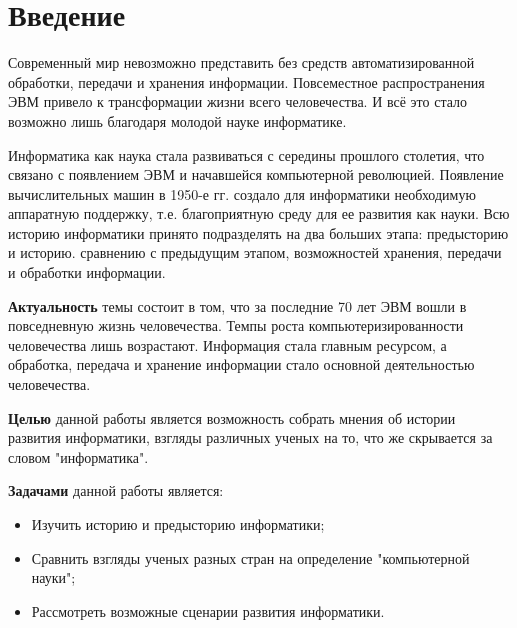 \chapter*{Введение}							%


Современный мир невозможно представить без средств автоматизированной обработки, передачи и хранения информации. Повсеместное распространения ЭВМ привело к трансформации жизни всего человечества. И всё это стало возможно лишь благодаря молодой науке информатике.

Информатика как наука стала развиваться с середины прошлого столетия, что связано с появлением ЭВМ и начавшейся компьютерной революцией. Появление вычислительных машин в 1950-е гг. создало для информатики необходимую аппаратную поддержку, т.е. благоприятную среду для ее развития как науки. Всю историю информатики принято подразделять на два больших этапа: предысторию и историю.
 сравнению с предыдущим этапом, возможностей хранения, передачи и обработки информации.

\textbf{Актуальность} темы состоит в том, что за последние 70 лет ЭВМ вошли  в повседневную жизнь человечества. Темпы роста компьютеризированности человечества лишь возрастают. Информация стала главным ресурсом, а обработка, передача и хранение информации стало основной деятельностью человечества.  

\textbf{Целью} данной работы является возможность собрать мнения об истории развития информатики, взгляды различных ученых на то, что же скрывается за словом "информатика".

\textbf{Задачами} данной работы является:
\begin{itemize}
\item Изучить историю и предысторию информатики;
\item Сравнить взгляды ученых разных стран на определение "компьютерной науки";
\item Рассмотреть возможные сценарии развития информатики.
\end{itemize}

\clearpage